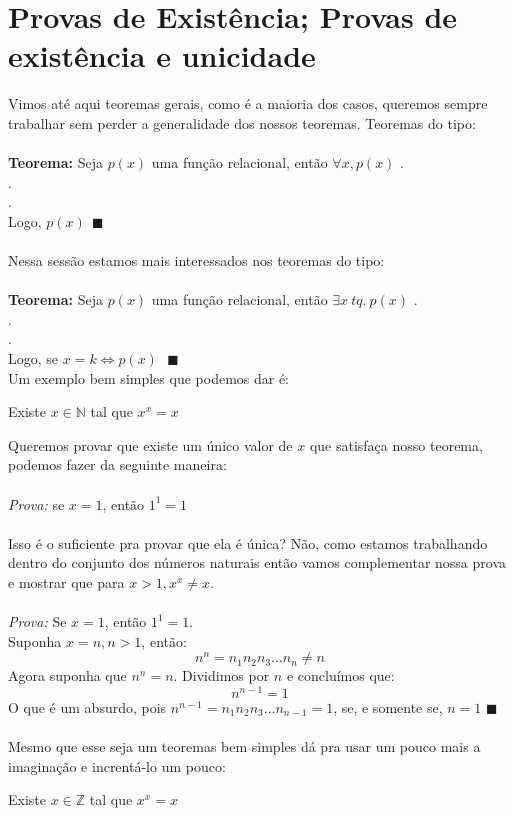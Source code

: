 \documentclass[main.tex]{subfiles}
\begin{document}
\section{Provas de Existência; Provas de existência e unicidade}
Vimos até aqui teoremas gerais, como é a maioria dos casos, queremos sempre trabalhar sem perder a generalidade dos nossos teoremas. Teoremas do tipo:
\\
\\
\textbf{Teorema:} Seja $p(x)$ uma função relacional, então $\forall x, p(x)$
.\\
.\\
.\\
Logo, $p(x) \ \ \blacksquare$
\\
\\
Nessa sessão estamos mais interessados nos teoremas do tipo:
\\
\\
\textbf{Teorema:} Seja $p(x)$ uma função relacional, então $ \exists x \ tq. \ p(x)$
.\\
.\\
.\\
Logo, se $ x = k \Leftrightarrow p(x) \ \ \ \blacksquare$
\\
Um exemplo bem simples que podemos dar é:
\begin{theorem}
Existe $x \in \mathbb{N}$ tal que $x^x = x$ 
\end{theorem}
Queremos provar que existe um único valor de $x$ que satisfaça nosso teorema, podemos fazer da seguinte maneira:
\\
\\
\textit{Prova: } se $x = 1$, então $1^1 = 1$
\\
\\
Isso é o suficiente pra provar que ela é única? Não, como estamos trabalhando dentro do conjunto dos números naturais então vamos complementar nossa prova e mostrar que para $x>1, x^x \neq x$.
\\
\\
\textit{Prova: } Se $x = 1$, então $1^1 = 1$.
\\ Suponha $x=n, n>1$, então:
$$n^n = n_1n_2n_3 \dots n_n \neq	n$$
Agora suponha que $n^n = n$. Dividimos por $n$ e concluímos que:
$$n^{n-1} = 1$$
O que é um absurdo, pois $n^{n-1} = n_1n_2n_3 \dots n_{n-1} =	1$, se, e somente se, $n=1$ \empty $\blacksquare$
\\
\\
Mesmo que esse seja um teoremas bem simples dá pra usar um pouco mais a imaginação e increntá-lo um pouco:
\begin{theorem}
Existe $x \in \mathbb{Z}$ tal que $x^x = x$ 
\end{theorem}
\end{document}
